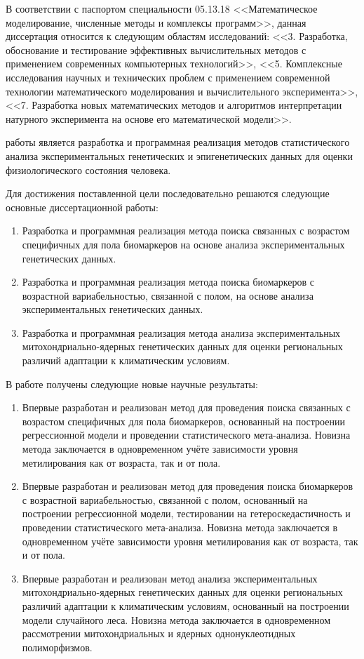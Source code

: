 В соответствии с паспортом специальности 05.13.18 <<Математическое моделирование, численные методы и комплексы программ>>, данная диссертация относится к следующим областям исследований: <<3. Разработка, обоснование и тестирование эффективных вычислительных методов с применением современных компьютерных технологий>>, <<5. Комплексные исследования научных и технических проблем с применением современной технологии математического моделирования и вычислительного эксперимента>>, <<7. Разработка новых математических методов и алгоритмов интерпретации натурного эксперимента на основе его математической модели>>.

{\aim} работы является разработка и программная реализация методов статистического анализа экспериментальных генетических и эпигенетических данных для оценки физиологического состояния человека.

Для достижения поставленной цели последовательно решаются следующие основные {\tasks} диссертационной работы:
\begin{enumerate}[beginpenalty=10000]
	\item Разработка и программная реализация метода поиска связанных с возрастом специфичных для пола биомаркеров на основе анализа экспериментальных генетических данных.
	\item Разработка и программная реализация метода поиска биомаркеров с возрастной вариабельностью, связанной с полом, на основе анализа экспериментальных генетических данных. 
	\item Разработка и программная реализация метода анализа экспериментальных митохондриально-ядерных генетических данных для оценки региональных различий адаптации к климатическим условиям. 
\end{enumerate}

{\novelty} В работе получены следующие новые научные результаты:
\begin{enumerate}[beginpenalty=10000] 
	\item Впервые разработан и реализован метод для проведения поиска связанных с возрастом специфичных для пола биомаркеров, основанный на построении регрессионной модели и проведении статистического мета-анализа. Новизна метода заключается в одновременном учёте зависимости уровня метилирования как от возраста, так и от пола.
	\item Впервые разработан и реализован метод для проведения поиска биомаркеров с возрастной вариабельностью, связанной с полом, основанный на построении регрессионной модели, тестировании на гетероскедастичность и проведении статистического мета-анализа. Новизна метода заключается в одновременном учёте зависимости уровня метилирования как от возраста, так и от пола. 
	\item Впервые разработан и реализован метод анализа экспериментальных митохондриально-ядерных генетических данных для оценки региональных различий адаптации к климатическим условиям, основанный на построении модели случайного леса. Новизна метода заключается в одновременном рассмотрении митохондриальных и ядерных однонуклеотидных полиморфизмов.
\end{enumerate}

